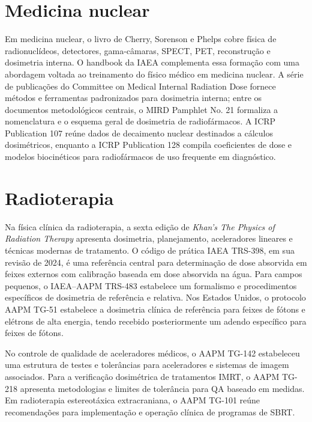 \section{Medicina nuclear}

Em medicina nuclear, o livro de Cherry, Sorenson e Phelps cobre física de radionuclídeos, detectores, gama-câmaras, SPECT, PET, reconstrução e dosimetria interna\supercite{cherry2012}. O handbook da IAEA complementa essa formação com uma abordagem voltada ao treinamento do físico médico em medicina nuclear\supercite{iaea_nucmed2015}. A série de publicações do Committee on Medical Internal Radiation Dose fornece métodos e ferramentas padronizados para dosimetria interna\supercite{snmmi_mird}; entre os documentos metodológicos centrais, o MIRD Pamphlet No. 21 formaliza a nomenclatura e o esquema geral de dosimetria de radiofármacos\supercite{bolch2009}. A ICRP Publication 107 reúne dados de decaimento nuclear destinados a cálculos dosimétricos\supercite{icrp107_2008}, enquanto a ICRP Publication 128 compila coeficientes de dose e modelos biocinéticos para radiofármacos de uso frequente em diagnóstico\supercite{icrp128_2015}.

\section{Radioterapia}

Na física clínica da radioterapia, a sexta edição de \emph{Khan's The Physics of Radiation Therapy} apresenta dosimetria, planejamento, aceleradores lineares e técnicas modernas de tratamento\supercite{gibbons2019}. O código de prática IAEA TRS-398, em sua revisão de 2024, é uma referência central para determinação de dose absorvida em feixes externos com calibração baseada em dose absorvida na água\supercite{iaea_trs398_2024}. Para campos pequenos, o IAEA--AAPM TRS-483 estabelece um formalismo e procedimentos específicos de dosimetria de referência e relativa\supercite{iaea_trs483_2017}. Nos Estados Unidos, o protocolo AAPM TG-51 estabelece a dosimetria clínica de referência para feixes de fótons e elétrons de alta energia\supercite{almond1999}, tendo recebido posteriormente um adendo específico para feixes de fótons\supercite{mcewen2014}.

No controle de qualidade de aceleradores médicos, o AAPM TG-142 estabeleceu uma estrutura de testes e tolerâncias para aceleradores e sistemas de imagem associados\supercite{klein2009}. Para a verificação dosimétrica de tratamentos IMRT, o AAPM TG-218 apresenta metodologias e limites de tolerância para QA baseado em medidas\supercite{miften2018}. Em radioterapia estereotáxica extracraniana, o AAPM TG-101 reúne recomendações para implementação e operação clínica de programas de SBRT\supercite{benedict2010}.


